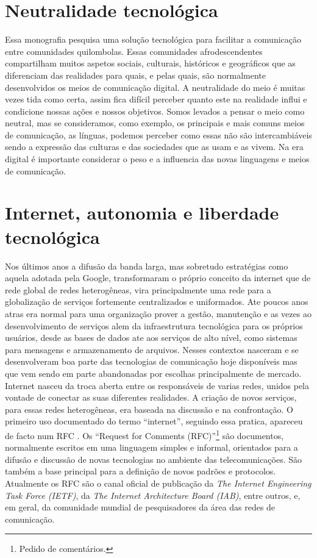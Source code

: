 \section{Neutralidade tecnológica}
Essa monografia pesquisa uma solução tecnológica para facilitar a
comunicação entre comunidades quilombolas. Essas comunidades
afrodescendentes compartilham muitos aspetos sociais, culturais,
históricos e geográficos que as diferenciam das realidades para quais,
e pelas quais, são normalmente desenvolvidos os meios de comunicação
digital. A neutralidade do meio é muitas vezes tida como certa, assim
fica difícil perceber quanto este na realidade influi e condicione
nossas ações e nossos objetivos. Somos levados a pensar o meio como
neutral, mas se consideramos, como exemplo, os principais e mais comuns
meios de comunicação, as línguas, podemos perceber como essas não são
intercambiáveis sendo a expressão das culturas e das sociedades que as
usam e as vivem. Na era digital é importante considerar o peso e a
influencia das novas linguagens e meios de comunicação. 

\section{Internet, autonomia e liberdade tecnológica}
Nos últimos anos a difusão da banda larga, mas sobretudo estratégias
como aquela adotada pela Google, transformaram o próprio conceito da
internet que de rede global de redes heterogêneas, vira principalmente
uma rede para a globalização de serviços fortemente centralizados e
uniformados. Ate poucos anos atras era normal para uma organização
prover a gestão, manutenção e as vezes ao desenvolvimento de serviços
alem da infraestrutura tecnológica para os próprios usuários, desde as
bases de dados ate aos serviços de alto nível, como sistemas para
mensagens e armazenamento de arquivos. Nesses contextos nasceram e se
desenvolveram boa parte das tecnologias de comunicação hoje
disponíveis mas que vem sendo em parte abandonadas por escolhas
principalmente de mercado. Internet nasceu da troca aberta entre os
responsáveis de varias redes, unidos pela vontade de conectar as suas
diferentes realidades. A criação de novos serviços, para essas redes
heterogêneas, era baseada na discussão e na confrontação. O primeiro
uso documentado do termo ``internet'', seguindo essa pratica, apareceu
de facto num RFC \citep{RFC675}. Os ``Request for Comments
(RFC)''\footnote{Pedido de comentários.} são documentos, normalmente
escritos em uma linguagem simples e informal, orientados para a
difusão e discussão de novas tecnologias no ambiente das
telecomunicações. São também a base principal para a definição de
novos padrões e protocolos. Atualmente os RFC são o canal oficial de
publicação da \emph{The Internet Engineering Task Force (IETF)}, da
\emph{The Internet Architecture Board (IAB)}, entre outros, e, em
geral, da comunidade mundial de pesquisadores da área das redes de
comunicação.

